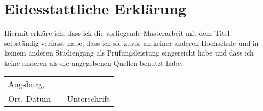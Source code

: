 \chapter*{Eidesstattliche Erklärung}
	\thispagestyle{empty}

		Hiermit erkläre ich, dass ich die vorliegende Masterarbeit mit dem Titel \textit{\thetitle}
selbständig verfasst habe, dass ich sie zuvor an keiner anderen Hochschule und in
keinem anderen Studiengang als Prüfungsleistung eingereicht habe und 
dass ich keine anderen als die angegebenen Quellen benutzt habe.
	\vspace{2cm}

		\begin{center}
			\begin{tabular}[h]{lp{2cm}p{5.5cm}}
				Augsburg, \thedate & & \\
				\cline{1-1}
				\cline{3-3}
				Ort, Datum& & Unterschrift
			\end{tabular}
		\end{center}